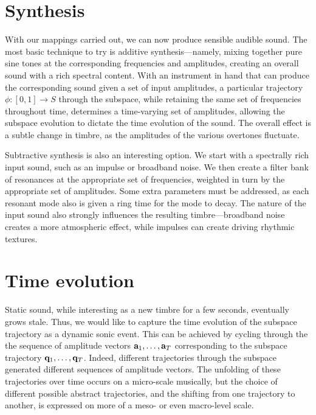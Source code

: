 \documentclass[11pt]{article}
\begin{document}
\section*{Synthesis}
With our mappings carried out, we can now produce sensible audible sound. The most basic technique to try is additive synthesis---namely, mixing together pure sine tones at the corresponding frequencies and amplitudes, creating an overall sound with a rich spectral content. With an instrument in hand that can produce the corresponding sound given a set of input amplitudes, a particular trajectory $\phi \colon [0, 1] \rightarrow S$ through the subspace, while retaining the same set of frequencies throughout time, determines a time-varying set of amplitudes, allowing the subspace evolution to dictate the time evolution of the sound. The overall effect is a subtle change in timbre, as the amplitudes of the various overtones fluctuate. 

Subtractive synthesis is also an interesting option. We start with a spectrally rich input sound, such as an impulse or broadband noise. We then create a filter bank of resonances at the appropriate set of frequencies, weighted in turn by the appropriate set of amplitudes. Some extra parameters must be addressed, as each resonant mode also is given a ring time for the mode to decay. The nature of the input sound also strongly influences the resulting timbre---broadband noise creates a more atmospheric effect, while impulses can create driving rhythmic textures. 

\section*{Time evolution}
Static sound, while interesting as a new timbre for a few seconds, eventually grows stale. Thus, we would like to capture the time evolution of the subspace trajectory as a dynamic sonic event. This can be achieved by cycling through the the sequence of amplitude vectors $\mathbf{a}_1, \ldots, \mathbf{a}_T$ corresponding to the subspace trajectory $\mathbf{q}_1, \ldots, \mathbf{q}_T$. Indeed, different trajectories through the subspace generated different sequences of amplitude vectors. The unfolding of these trajectories over time occurs on a micro-scale musically, but the choice of different possible abstract trajectories, and the shifting from one trajectory to another, is expressed on more of a meso- or even macro-level scale.
\end{document}
